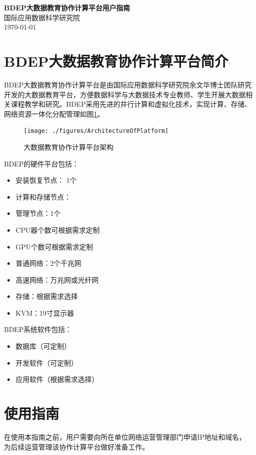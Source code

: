 \documentclass[12pt]{ctexart}%
\begin{document}
\begin{center}
  \Large \textbf{BDEP大数据教育协作计算平台用户指南} \\
  \vspace{0.1in}
  \normalsize 国际应用数据科学研究院 \\
  \today
\end{center}

\tableofcontents
\newpage

\section {BDEP大数据教育协作计算平台简介}
BDEP大数据教育协作计算平台是由国际应用数据科学研究院余文华博士团队研究开发的大数据教育平台，方便数据科学与大数据技术专业教师、学生开展大数据相关课程教学和研究。BDEP采用先进的并行计算和虚拟化技术，实现计算、存储、网络资源一体化分配管理如图\ref{fig:architecture}。

\begin{figure}[!htb]
\centering
\texttt{[image: ./figures/ArchitectureOfPlatform]}
\caption{大数据教育协作计算平台架构}
\label{fig:architecture}
\end{figure}
BDEP的硬件平台包括：
\begin{itemize}
\item 安装恢复节点： 1个
\item 计算和存储节点：
\item 管理节点：1个
\item CPU器个数可根据需求定制
\item GPU个数可根据需求定制
\item 普通网络：2个千兆网
\item 高速网络：万兆网或光纤网
\item 存储：根据需求选择
\item KVM：19寸显示器
\end{itemize}

BDEP系统软件包括：
\begin{itemize}
\item 数据库（可定制）
\item 开发软件（可定制）
\item 应用软件（根据需求选择）
\end{itemize}

\section {使用指南}
在使用本指南之前，用户需要向所在单位网络运营管理部门申请IP地址和域名，为后续运营管理该协作计算平台做好准备工作。
\end{document}
